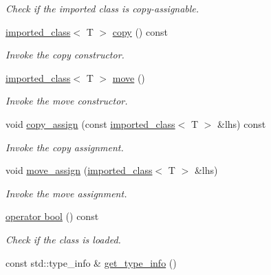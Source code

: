 \begin{DoxyCompactItemize}
\begin{DoxyCompactList}\small\item\em Check if the imported class is copy-\/assignable. \end{DoxyCompactList}\item 
\hyperlink{a00155}{imported\+\_\+class}$<$ T $>$ \hyperlink{a00155_ae0ed5174a07920cfedf27feb098ccbe4}{copy} () const 
\begin{DoxyCompactList}\small\item\em Invoke the copy constructor. \end{DoxyCompactList}\item 
\hyperlink{a00155}{imported\+\_\+class}$<$ T $>$ \hyperlink{a00155_a081d37ced4c6ac2b130d353dac432854}{move} ()
\begin{DoxyCompactList}\small\item\em Invoke the move constructor. \end{DoxyCompactList}\item 
void \hyperlink{a00155_aab4bb209f1b38f0d5476b462dd6a30f6}{copy\+\_\+assign} (const \hyperlink{a00155}{imported\+\_\+class}$<$ T $>$ \&lhs) const 
\begin{DoxyCompactList}\small\item\em Invoke the copy assignment. \end{DoxyCompactList}\item 
void \hyperlink{a00155_a0e6112cf988cbe0a2b05e0d5dc874a66}{move\+\_\+assign} (\hyperlink{a00155}{imported\+\_\+class}$<$ T $>$ \&lhs)
\begin{DoxyCompactList}\small\item\em Invoke the move assignment. \end{DoxyCompactList}\item 
\hyperlink{a00155_a022a956a738f171e01d5216b74855daf}{operator bool} () const \hypertarget{a00155_a022a956a738f171e01d5216b74855daf}{}\label{a00155_a022a956a738f171e01d5216b74855daf}

\begin{DoxyCompactList}\small\item\em Check if the class is loaded. \end{DoxyCompactList}\item 
const std\+::type\+\_\+info \& \hyperlink{a00155_ab1922e488e5781cdc211d954202170f5}{get\+\_\+type\+\_\+info} ()\hypertarget{a00155_ab1922e488e5781cdc211d954202170f5}{}\label{a00155_ab1922e488e5781cdc211d954202170f5}


\end{DoxyCompactItemize}
